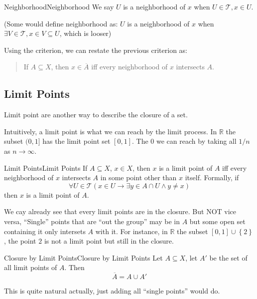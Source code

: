 \documentclass[../main.tex]{subfiles}
\begin{document}
\begin{definition}{Neighborhood}{Neighborhood}
We say $U$ is a neighborhood of $x$ when $U\in \mathcal{T}, x\in U$.

(Some would define neighborhood as: $U$ is a neighborhood of $x$ when $\exists V\in \mathcal{T}, x\in V \subseteq U$, which is looser)
\end{definition}
Using the criterion, we can restate the previous criterion as:
\begin{quote}
If $A \subseteq X$, then $x\in \overline{A}$ iff every neighborhood of  $x$ intersects $A$.
\end{quote}

\subsection{Limit Points}
Limit point are another way to describe the closure of a set.

Intuitively, a limit point is what we can reach by the limit process. In $\mathbb{R}$ the subset $(0,1]$ has the limit point set $[0,1]$. The $0$ we can reach by taking all $1 / n$ as $n \rightarrow  \infty $.

\begin{definition}{Limit Points}{Limit Points}
If $A \subseteq X$, $x\in X$, then $x$ is a limit point of $A$ iff every neighborhood of $x$ intersects $A$ in some point other than $x$ itself. Formally, if
\begin{equation*}
\forall U\in \mathcal{T}(x\in U \rightarrow \exists y\in A\cap U \land y\neq x)
\end{equation*}
then $x$ is a limit point of $A$.
\end{definition}

\begin{remark}
	We cay already see that every limit points are in the closure. But NOT vice versa, ``Single'' points that are ``out the group'' may be in $A$ but some open set containing it only intersets $A$ with it. For instance, in $\mathbb{R}$ the subset $[0,1]\cup \left\{ 2 \right\}$, the point $2$ is not a limit point but still in the closure.
\end{remark}

\begin{theorem}{Closure by Limit Points}{Closure by Limit Points}
Let $A \subseteq X$, let $A'$ be the set of all limit points of $A$. Then
\begin{equation}
\overline{A} = A\cup A'
\end{equation}
\end{theorem}
This is quite natural actually, just adding all ``single points'' would do.
\end{document}
